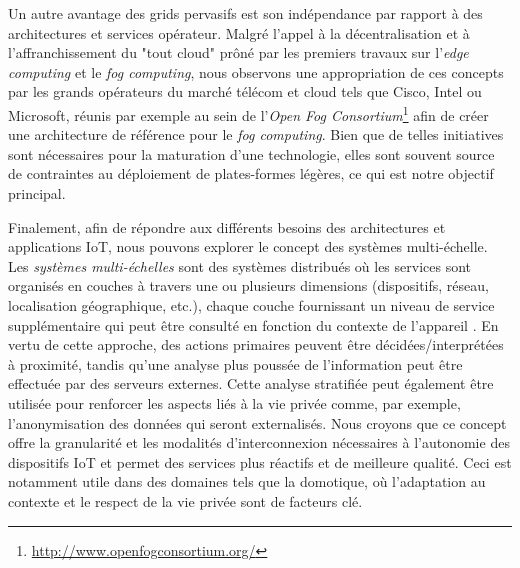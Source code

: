 Un autre avantage des grids pervasifs est son indépendance par rapport à des architectures et services opérateur. Malgré l'appel à la décentralisation et à l'affranchissement du "tout cloud" prôné par les premiers travaux sur l'\textit{edge computing} et le \textit{fog computing}, nous observons une appropriation de ces concepts par les grands opérateurs du marché télécom et cloud tels que Cisco, Intel ou Microsoft, réunis par exemple au sein de l'\textit{Open Fog Consortium}\footnote{\url{http://www.openfogconsortium.org/}} afin de créer une architecture de référence pour le \textit{fog computing}. Bien que de telles initiatives sont nécessaires pour la maturation d'une technologie, elles sont souvent source de contraintes au déploiement de plates-formes légères, ce qui est notre objectif principal.

Finalement, afin de répondre aux différents besoins des architectures et applications IoT, nous pouvons explorer le concept des systèmes multi-échelle. Les \textit {systèmes multi-échelles} sont des systèmes distribués où les services sont organisés en couches à travers une ou plusieurs dimensions (dispositifs, réseau, localisation géographique, etc.), chaque couche fournissant un niveau de service supplémentaire qui peut être consulté en fonction du contexte de l'appareil \cite{Rottenberg2012,Rottenberg2014}.  En vertu de cette approche, des actions primaires peuvent être décidées/interprétées à proximité, tandis qu'une analyse plus poussée de l'information peut être effectuée par des serveurs externes. Cette analyse stratifiée peut également être utilisée pour renforcer les aspects liés à la vie privée comme, par exemple, l'anonymisation des données qui seront externalisés. Nous croyons que ce concept offre la granularité et les modalités d'interconnexion nécessaires à l'autonomie des dispositifs IoT et permet des services plus réactifs et de meilleure qualité. Ceci est notamment utile dans des domaines tels que la domotique, où l'adaptation au contexte et le respect de la vie privée sont de facteurs clé.


